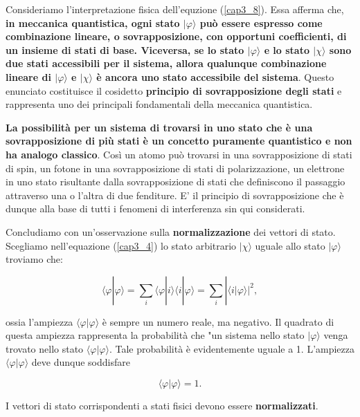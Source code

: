 \documentclass[a4paper,12pt,oneside]{book}
\begin{document}
Consideriamo l'interpretazione fisica dell'equzione (\ref{cap3_8}). Essa afferma che, \textbf{in meccanica quantistica, ogni stato $| \varphi \rangle$ può essere espresso come combinazione lineare, o sovrapposizione, con opportuni coefficienti, di un insieme di stati di base. Viceversa, se lo stato $| \varphi \rangle$ e lo stato $| \chi \rangle$ sono due stati accessibili per il sistema, allora qualunque combinazione lineare di $| \varphi \rangle$ e $| \chi \rangle$ è ancora uno stato accessibile del sistema}. Questo enunciato costituisce il cosidetto \textbf{principio di sovrapposizione degli stati} e rappresenta uno dei principali fondamentali della meccanica quantistica.

\textbf{La possibilità per un sistema di trovarsi in uno stato che è una sovrapposizione di più stati è un concetto puramente quantistico e non ha analogo classico}. Così un atomo può trovarsi in una sovrapposizione di stati di spin, un fotone in una sovrapposizione di stati di polarizzazione, un elettrone in uno stato risultante dalla sovrapposizione di stati che definiscono il passaggio attraverso una o l'altra di due fenditure. E' il principio di sovrapposizione che è dunque alla base di tutti i fenomeni di interferenza sin qui considerati.

Concludiamo con un'osservazione sulla \textbf{normalizzazione} dei vettori di stato. Scegliamo nell'equazione (\ref{cap3_4}) lo stato arbitrario $| \chi \rangle$ uguale allo stato $| \varphi \rangle$ troviamo che:

\begin{equation}
\langle \varphi | \varphi \rangle = \sum \limits_{i} \langle \varphi | i \rangle \langle i | \varphi \rangle = \sum \limits_{i} |\langle i | \varphi \rangle |^2 ,
\end{equation}

ossia l'ampiezza $\langle \varphi| \varphi \rangle$ è sempre un numero reale, ma negativo. Il quadrato di questa ampiezza rappresenta la probabilità che "un sistema nello stato $| \varphi \rangle$ venga trovato nello stato $\langle \varphi | \varphi \rangle $. Tale probabilità è evidentemente uguale a 1. L'ampiezza $\langle \varphi| \varphi \rangle$ deve dunque soddisfare

\begin{equation}
\langle \varphi| \varphi \rangle =1 .
\end{equation}

I vettori di stato corrispondenti a stati fisici devono essere \textbf{normalizzati}.
\end{document}
